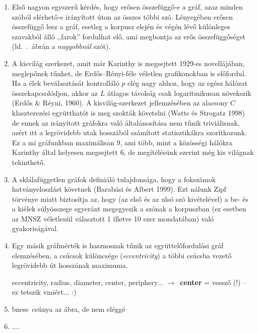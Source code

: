 \documentclass{llncs}
\newcommand{\nyil}{$\rightarrow$\ }
\newcommand{\embf}[1]{\textbf{#1}}
\newcommand{\bness}{bness}   %
\begin{document}
\begin{enumerate}

\item 
Első nagyon egyszerű kérdés, hogy erősen összefüggő-e a gráf,
azaz minden szóból elérhető-e irányított úton az összes többi szó.
Lényegében erősen összefüggő lesz a gráf,
esetleg a korpusz elején és végén lévő
különleges szavakból álló ,,farok'' fordulhat elő,
ami megbontja az erős összefüggőséget
(ld.\ .\ ábrán a \emph{nagyobbnál} szót).

\item A kisvilág szerkezet, amit már  Karinthy is megsejtett 1929-es
  novellájában, meglepőnek tűnhet, de Erdős--Rényi-féle véletlen grafikonokban
    is előfordul. Ha a élek beválasztását kontrolláló $p$ elég nagy ahhoz, hogy
    az egész hálózat összekapcsolódjon, akkor az $L$ átlagos távolság csak
    logaritmikusan növekszik (Erdős \& Réyni, 1960). A kisvilág-szerkezet
    jellemzésében az alacsony $C$ klaszterezési együtthatót is meg szokták
    követelni (Watts és Strogatz 1998) de ennek az irányított gráfokra való
    általánosítása nem tűnik triviálisnak, azért itt a legrövidebb utak
    hosszából számított statisztikákra szorítkozunk. Ez a mi gráfunkban
    maximálisan 9, ami több, mint a közösségi hálókra Karinthy által helyesen
    megsejtett 6, de megítélésünk szerint még kis világnak tekinthető.
    
\item 
  A sklálafüggetlen gráfok definiáló tulajdonsága, hogy a fokszámok
    hatványeloszlást követnek (Barabási és Albert 1999). Ezt nálunk Zipf
    törvénye miatt 
    biztosítja az, hogy (az első és az ulsó szó kivételével) a be- és a kiélek
    súlyösszege egyeránt megegyezik a szónak a korpuszban (ez esetben az MNSZ
    véletlenül választott 1 illetve 10 ezer mondatában) való gyakoriságával.

\item
  Egy másik gráfmérték is hasznosnak tűnik az együttelőfordulási gráf 
    elemzésében, a csúcsok különcsége (\emph{eccentricity}) a többi csúcsba
    vezető legrövidebb út hosszának maximuma. 
    
    eccentricity, radius, diameter, center, periphery...
\nyil \embf{center} = vessző (!) -- ez tetszik vmiért... :)

\item 
\bness\ csúnya az ábra, de nem eléggé

\item 
....
\end{enumerate}
\end{document}
